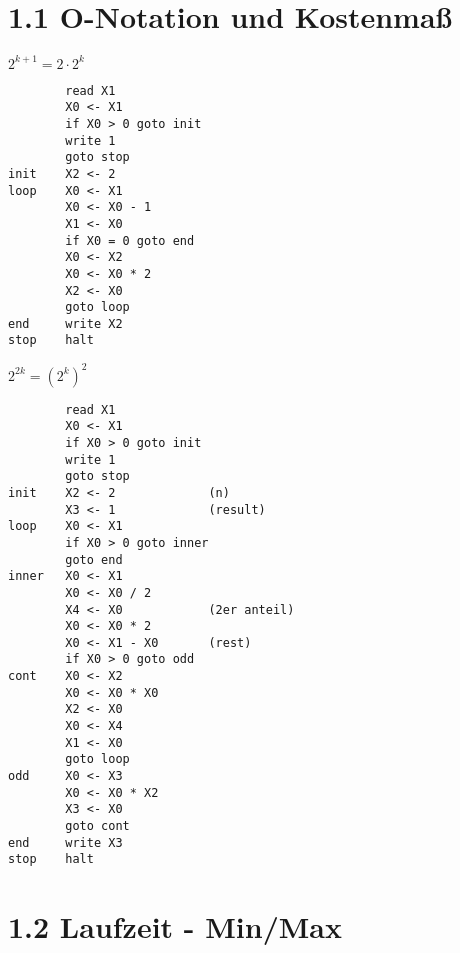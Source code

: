 

\section*{1.1 O-Notation und Kostenmaß}

\textbf{$2^{k+1} = 2 \cdot 2^k$}

\begin{lstlisting}
        read X1
        X0 <- X1
        if X0 > 0 goto init
        write 1
        goto stop
init    X2 <- 2
loop    X0 <- X1
        X0 <- X0 - 1
        X1 <- X0
        if X0 = 0 goto end
        X0 <- X2
        X0 <- X0 * 2
        X2 <- X0
        goto loop
end     write X2
stop    halt    
\end{lstlisting}

\textbf{$2^{2k} = (2^k)^2$}

\begin{lstlisting}
        read X1
        X0 <- X1
        if X0 > 0 goto init
        write 1
        goto stop
init    X2 <- 2             (n)
        X3 <- 1             (result)
loop    X0 <- X1
        if X0 > 0 goto inner
        goto end
inner   X0 <- X1
        X0 <- X0 / 2        
        X4 <- X0            (2er anteil)
        X0 <- X0 * 2
        X0 <- X1 - X0       (rest)
        if X0 > 0 goto odd
cont    X0 <- X2
        X0 <- X0 * X0
        X2 <- X0
        X0 <- X4
        X1 <- X0
        goto loop
odd     X0 <- X3
        X0 <- X0 * X2
        X3 <- X0
        goto cont
end     write X3
stop    halt    
\end{lstlisting}

\section*{1.2 Laufzeit - Min/Max}






